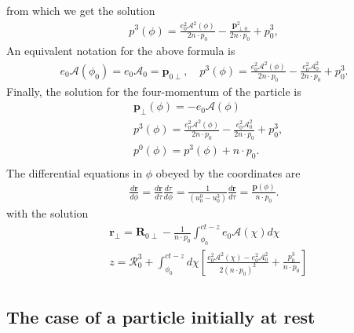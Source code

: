 from which we get the solution
\begin{align}
  p^{3}(\phi)=\frac{e_{0}^{2} \mathcal{A}^{2}(\phi)}{2 n \cdot p_{0}}-\frac{\mathbf{p}_{\perp 0}^{2}}{2 n \cdot p_{0}}+p_{0}^{3}, \label{II.2.3.13}
\end{align}
An equivalent notation for the above formula is
\begin{align}
  e_{0} \mathcal{A}\left(\phi_{0}\right)=e_{0} \mathcal{A}_{0}=\mathbf{p}_{0 \perp}, \quad p^{3}(\phi)=\frac{e_{0}^{2} \mathcal{A}^{2}(\phi)}{2 n \cdot p_{0}}-\frac{e_{0}^{2} \mathcal{A}_{0}^{2}}{2 n \cdot p_{0}}+p_{0}^{3} . \label{II.2.3.14}
\end{align}
Finally, the solution for the four-momentum of the particle is
\begin{align}
   & \mathbf{p}_{\perp}(\phi)=-e_{0} \boldsymbol{\mathcal { A }}(\phi)  \label{II.2.3.15}                                                                    \\
   & p^{3}(\phi)=\frac{e_{0}^{2} \mathcal{A}^{2}(\phi)}{2 n \cdot p_{0}}-\frac{e_{0}^{2} \mathcal{A}_{0}^{2}}{2 n \cdot p_{0}}+p_{0}^{3},  \label{II.2.3.16} \\
   & p^{0}(\phi)=p^{3}(\phi)+n \cdot p_{0} . \label{II.2.3.17}                                                                                               \\
\end{align}
The differential equations in $\phi$ obeyed by the coordinates are
\begin{align}
  \frac{d \mathbf{r}}{d \phi}=\frac{d \mathbf{r}}{d \tau} \frac{d \tau}{d \phi}=\frac{1}{\left(u_{0}^{0}-u_{0}^{3}\right)} \frac{d \mathbf{r}}{d \tau}=\frac{\mathbf{p}(\phi)}{n \cdot p_{0}} . \label{II.2.3.18}
\end{align}
with the solution
\begin{align}
   & \mathbf{r}_{\perp}=\boldsymbol{R}_{0 \perp}-\frac{1}{n \cdot p_{0}} \int_{\phi_{0}}^{c t-z} e_{0} \boldsymbol{\mathcal { A }}(\chi) d \chi  \label{II.2.3.19}                                                                                            \\
   & z=\mathcal{R}_{0}^{3}+\int_{\phi_{0}}^{c t-z} d \chi\left[\frac{e_{0}^{2} \boldsymbol{\mathcal { A }}^{2}(\chi)-e_{0}^{2} \boldsymbol{\mathcal { A }}_{0}^{2}}{2\left(n \cdot p_{0}\right)^{2}}+\frac{p_{0}^{3}}{n \cdot p_{0}}\right] \label{II.2.3.20} \\
\end{align}


\subsection{The case of a particle initially at rest}

